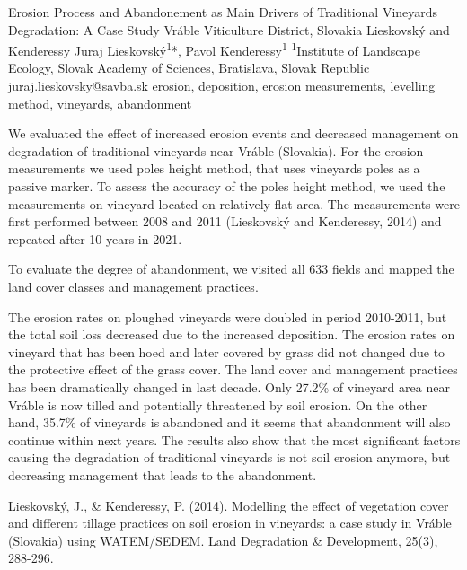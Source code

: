 \abstract
{Erosion Process and Abandonement as Main Drivers of Traditional Vineyards Degradation: A Case Study Vráble Viticulture District, Slovakia} 
{Lieskovský and Kenderessy} 
{Juraj Lieskovský\textsuperscript{1}*, Pavol Kenderessy\textsuperscript{1}} 
{\TLtag} 
{
\textsuperscript{1}Institute of Landscape Ecology, Slovak Academy of Sciences, Bratislava, Slovak Republic
}
{juraj.lieskovsky@savba.sk}  %
{erosion, deposition, erosion measurements, levelling method, vineyards, abandonment}
{We evaluated the effect of increased erosion events and decreased management on degradation of traditional vineyards near Vráble (Slovakia). For the erosion measurements we used poles height method, that uses vineyards poles as a passive marker. To assess the accuracy of the poles height method, we used the measurements on vineyard located on relatively flat area. The measurements were first performed between 2008 and 2011 (Lieskovský and Kenderessy, 2014) and repeated after 10 years in 2021.

To evaluate the degree of abandonment, we visited all 633 fields and mapped the land cover classes and management practices. 

The erosion rates on ploughed vineyards were doubled in period 2010-2011, but the total soil loss decreased due to the increased deposition. The erosion rates on vineyard that has been hoed and later covered by grass did not changed due to the protective effect of the grass cover. The land cover and management practices has been dramatically changed in last decade. Only 27.2\% of vineyard area near Vráble is now tilled and potentially threatened by soil erosion. On the other hand, 35.7\% of vineyards is abandoned and it seems that abandonment will also continue within next years. The results also show that the most significant factors causing the degradation of traditional vineyards is not soil erosion anymore, but decreasing management that leads to the abandonment.
}
{Lieskovský, J., \& Kenderessy, P. (2014). Modelling the effect of vegetation cover and different tillage practices on soil erosion in vineyards: a case study in Vráble (Slovakia) using WATEM/SEDEM. Land Degradation \& Development, 25(3), 288-296.
}

